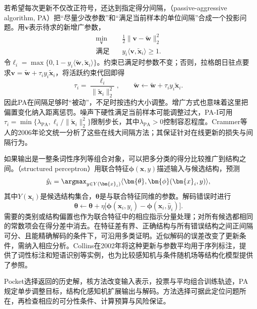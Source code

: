 若希望每次更新不仅改正符号，还达到指定得分间隔，（passive-aggressive algorithm, PA）把“尽量少改参数”和“满足当前样本的单位间隔”合成一个投影问题。用$\bm{v}$表示待求的新增广参数，
\begin{equation}
  \label{eq:classification-pa-projection}
  \begin{aligned}
    \min_{\bm{v}}\quad&
      \frac12\|\bm{v}-\tilde{\bm{w}}\|_2^2\\
    \text{满足}\quad&
      y_i\langle\bm{v},\tilde{\bm{x}}_i\rangle\geq1 .
  \end{aligned}
\end{equation}
令$\ell_i=\max\{0,1-y_i\langle\tilde{\bm{w}},\tilde{\bm{x}}_i\rangle\}$。约束已满足时参数不变；否则，拉格朗日驻点要求$\bm{v}=\tilde{\bm{w}}+\tau_i y_i\tilde{\bm{x}}_i$，将活跃约束代回即得
\[
  \tau_i=\frac{\ell_i}{\|\tilde{\bm{x}}_i\|_2^2},
  \qquad
  \tilde{\bm{w}}\leftarrow
    \tilde{\bm{w}}+\tau_i y_i\tilde{\bm{x}}_i .
\]
因此PA在间隔足够时“被动”，不足时按违约大小调整。增广方式也意味着这里把偏置变化纳入距离惩罚。噪声下硬性满足当前样本可能调整过大，PA-I可用$\tau_i=\min\{\lambda_{\mathrm{PA}},\ell_i/\|\tilde{\bm{x}}_i\|_2^2\}$限制步长，其中$\lambda_{\mathrm{PA}}>0$控制容忍程度。Crammer等人的2006年论文统一分析了这些在线大间隔方法；其保证针对在线更新的损失与间隔行为。

如果输出是一整条词性序列等组合对象，可以把多分类的得分比较推广到结构之间。（structured perceptron）用联合特征$\bm{\phi}(\bm{x},y)$描述输入与候选结构，预测
\[
  \hat y_i=\argmax_{y\in Y(\bm{x}_i)}
    \langle\bm{\theta},\bm{\phi}(\bm{x}_i,y)\rangle ,
\]
其中$Y(\bm{x}_i)$是候选结构集合，$\bm{\theta}$是与联合特征同维的参数。解码错误时进行
\[
  \bm{\theta}\leftarrow\bm{\theta}
    +\eta\bigl[\bm{\phi}(\bm{x}_i,y_i)
      -\bm{\phi}(\bm{x}_i,\hat y_i)\bigr].
\]
需要的类别或结构偏置也作为联合特征中的相应指示分量处理；对所有候选都相同的常数项会在得分差中消去。在特征差有界、正确结构与所有错误结构之间正间隔可分、且能精确解码的条件下，可沿用多类证明。近似解码的误差改变了更新条件，需纳入相应分析。Collins在2002年将这种更新与参数平均用于序列标注，提供了词性标注和短语识别等实例，也为比较感知机与条件随机场等结构化模型提供了参照。

Pocket选择返回的历史解，核方法改变输入表示，投票与平均组合训练轨迹，PA规定单步调整目标，结构化感知机扩展输出与解码。方法选择可据此定位问题所在，再检查相应的可分性条件、计算预算与风险保证。